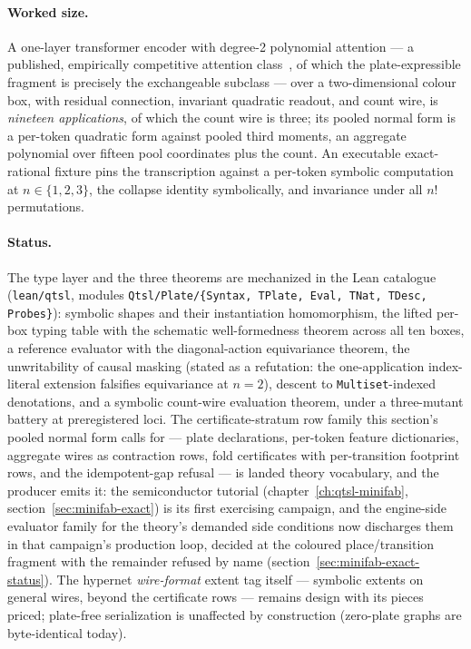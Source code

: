 \paragraph{Worked size.} A one-layer transformer encoder with
degree-2 polynomial attention --- a published, empirically
competitive attention class~\cite{letourneau24padre}, of which the
plate-expressible fragment is precisely the exchangeable
subclass --- over a two-dimensional colour box, with residual
connection, invariant quadratic readout, and count wire, is
\emph{nineteen applications}, of which the count wire is three; its
pooled normal form is a per-token quadratic form against pooled
third moments, an aggregate polynomial over fifteen pool coordinates
plus the count. An executable exact-rational fixture pins the
transcription against a per-token symbolic computation at
$n \in \{1, 2, 3\}$, the collapse identity symbolically, and
invariance under all $n!$ permutations.

\paragraph{Status.} The type layer and the three theorems are
mechanized in the Lean catalogue
(\texttt{lean/qtsl}, modules \texttt{Qtsl/Plate/\{Syntax, TPlate,
Eval, TNat, TDesc, Probes\}}): symbolic shapes and their
instantiation homomorphism, the lifted per-box typing table with the
schematic well-formedness theorem across all ten boxes, a reference
evaluator with the diagonal-action equivariance theorem, the
unwritability of causal masking (stated as a refutation: the
one-application index-literal extension falsifies equivariance at
$n = 2$), descent to \texttt{Multiset}-indexed denotations, and a
symbolic count-wire evaluation theorem, under a three-mutant battery
at preregistered loci. The certificate-stratum row family this
section's pooled normal form calls for --- plate declarations,
per-token feature dictionaries, aggregate wires as contraction rows,
fold certificates with per-transition footprint rows, and the
idempotent-gap refusal --- is landed theory vocabulary, and the
producer emits it: the semiconductor tutorial
(chapter~\ref{ch:qtsl-minifab}, section~\ref{sec:minifab-exact}) is
its first exercising campaign, and the engine-side evaluator family
for the theory's demanded side conditions now discharges them in
that campaign's production loop, decided at the coloured
place/transition fragment with the remainder refused by name
(section~\ref{sec:minifab-exact-status}). The
hypernet \emph{wire-format} extent tag itself --- symbolic extents
on general wires, beyond the certificate rows --- remains design
with its pieces priced; plate-free serialization is unaffected by
construction (zero-plate graphs are byte-identical today).

